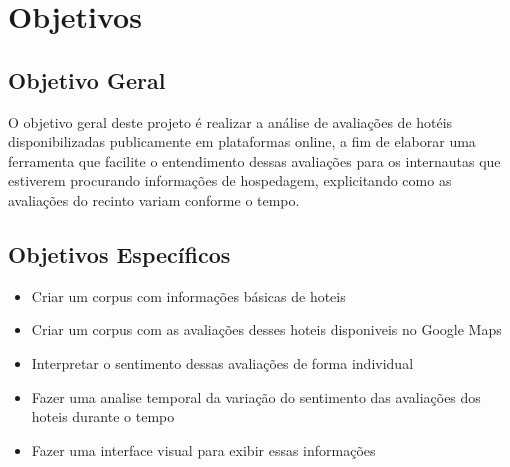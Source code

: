 \chapter{Objetivos}

\label{cap:objetivos}

\section{Objetivo Geral}

O objetivo geral deste projeto é realizar a análise de avaliações de hotéis disponibilizadas publicamente em plataformas online, a fim de elaborar uma ferramenta que facilite o entendimento dessas avaliações para os internautas que estiverem procurando informações de hospedagem, explicitando como as avaliações do recinto variam conforme o tempo.

\section{Objetivos Específicos}

\begin{itemize} 
    \item Criar um corpus com informações básicas de hoteis
    \item Criar um corpus com as avaliações desses hoteis disponiveis no Google Maps
    \item Interpretar o sentimento dessas avaliações de forma individual
    \item Fazer uma analise temporal da variação do sentimento das avaliações dos hoteis durante o tempo
    \item Fazer uma interface visual para exibir essas informações
\end{itemize}

